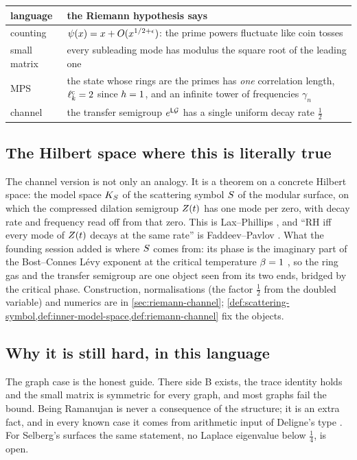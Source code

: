 \begin{center}
\begin{tabular}{@{}p{2.4cm}p{11.6cm}@{}}
\toprule
language & the Riemann hypothesis says \\
\midrule
counting & $\psi(x) = x + O(x^{1/2+\epsilon})$: the prime powers fluctuate like coin tosses \\
small matrix & every subleading mode has modulus the square root of the leading one \\
MPS & the state whose rings are the primes has \emph{one} correlation length, $\ell^{\mathrm{c}}_{k} = 2$ since $h = 1$, and an infinite tower of frequencies $\gamma_n$ \\
channel & the transfer semigroup $e^{\mathsf L\mathcal G}$ has a single uniform decay rate $\tfrac12$ \\
\bottomrule
\end{tabular}
\end{center}

\subsection{The Hilbert space where this is literally true}

The channel version is not only an analogy. It is a theorem on a concrete Hilbert
space: the model space $K_S$ of the scattering symbol $S$ of the modular surface,
on which the compressed dilation semigroup $Z(t)$ has one mode per zero, with decay
rate and frequency read off from that zero. This is Lax--Phillips
\cite{laxphillips1976}, and ``RH iff every mode of $Z(t)$ decays at the same rate'' is
Faddeev--Pavlov \cite{faddeev1972scattering}. What the founding session added is where
$S$ comes from: its phase is the imaginary part of the Bost--Connes Lévy exponent
at the critical temperature $\beta = 1$ \cite{bostconnes1995}, so the ring gas and
the transfer semigroup are one object seen from its two ends, bridged by the critical
phase. Construction, normalisations (the factor $\tfrac12$ from the doubled variable)
and numerics are in \cref{sec:riemann-channel};
\cref{def:scattering-symbol,def:inner-model-space,def:riemann-channel} fix the
objects.

\subsection{Why it is still hard, in this language}

The graph case is the honest guide. There side B exists, the trace identity holds and
the small matrix is symmetric for every graph, and most graphs fail the bound. Being
Ramanujan is never a consequence of the structure; it is an extra fact, and in every
known case it comes from arithmetic input of Deligne's type \cite{deligne1974weil}.
For Selberg's surfaces the same statement, no Laplace eigenvalue below $\tfrac14$, is
open.

